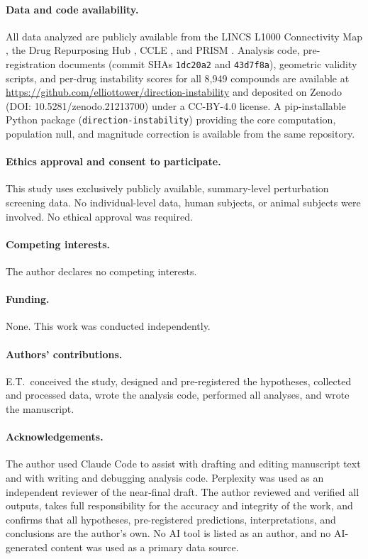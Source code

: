 \documentclass[11pt]{article}
\begin{document}
\paragraph{Data and code availability.} All data analyzed are publicly
available from the LINCS L1000 Connectivity Map
\citep{subramanian2017next}, the Drug Repurposing Hub
\citep{corsello2017drug}, CCLE \citep{barretina2012cancer}, and PRISM
\citep{corsello2020discovering}.  Analysis code, pre-registration
documents (commit SHAs \texttt{1dc20a2} and \texttt{43d7f8a}),
geometric validity scripts, and per-drug instability scores for all
8{,}949 compounds are available at
\url{https://github.com/elliottower/direction-instability} and
deposited on Zenodo (DOI: 10.5281/zenodo.21213700) under a CC-BY-4.0
license.  A pip-installable Python package
(\texttt{direction-instability}) providing the core computation,
population null, and magnitude correction is available from the same
repository.

\paragraph{Ethics approval and consent to participate.}
This study uses exclusively publicly available, summary-level
perturbation screening data.  No individual-level data, human subjects,
or animal subjects were involved.  No ethical approval was required.

\paragraph{Competing interests.}
The author declares no competing interests.

\paragraph{Funding.}
None.  This work was conducted independently.

\paragraph{Authors' contributions.}
E.T.\ conceived the study, designed and pre-registered the hypotheses,
collected and processed data, wrote the analysis code, performed all
analyses, and wrote the manuscript.

\paragraph{Acknowledgements.}
The author used Claude Code \citep{claudecode} to assist with drafting
and editing manuscript text and with writing and debugging analysis
code.  Perplexity \citep{perplexityai} was used as an independent
reviewer of the near-final draft.  The author reviewed and verified all
outputs, takes full responsibility for the accuracy and integrity of the
work, and confirms that all hypotheses, pre-registered predictions,
interpretations, and conclusions are the author's own.  No AI tool is
listed as an author, and no AI-generated content was used as a primary
data source.
\end{document}
